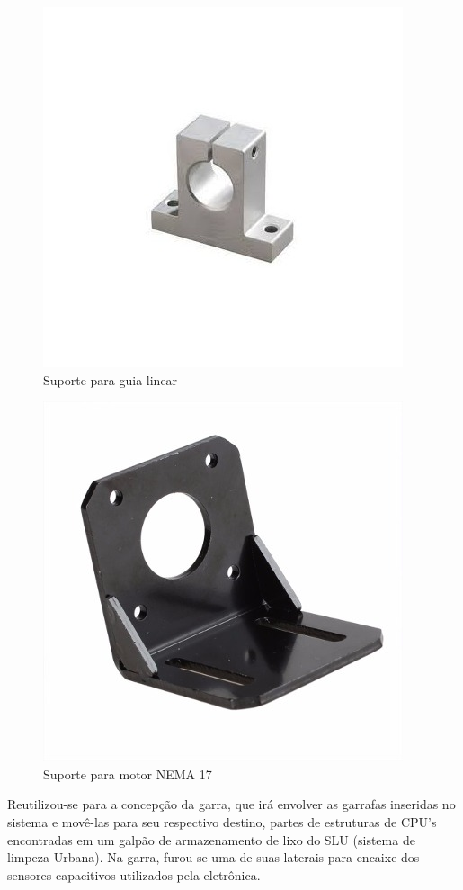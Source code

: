 \begin{figure}[!h]
	\centering
		\includegraphics[scale=0.3]{figuras/estrutura/7-Suporte-para-guia-linear.jpg}
	\caption{Suporte para guia linear}
\end{figure}

\begin{figure}[!h]
	\centering
		\includegraphics[scale=0.2]{figuras/estrutura/8-Suporte-para-motor-NEMA-17.jpg}
	\caption{Suporte para motor NEMA 17}
\end{figure}

Reutilizou-se para a concepção da garra, que irá envolver as garrafas inseridas no sistema e movê-las para seu respectivo destino, partes de estruturas de CPU’s encontradas em um galpão de armazenamento de lixo do SLU (sistema de limpeza Urbana). Na garra, furou-se uma de suas laterais para encaixe dos sensores capacitivos utilizados pela eletrônica.

